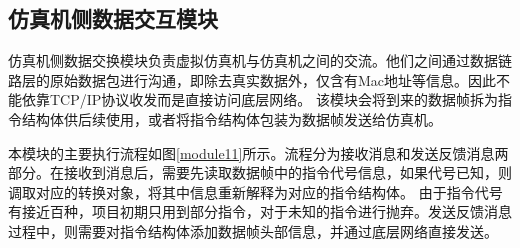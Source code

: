 \subsection{仿真机侧数据交互模块}
仿真机侧数据交换模块负责虚拟仿真机与仿真机之间的交流。他们之间通过数据链路层的原始数据包进行沟通，即除去真实数据外，仅含有Mac地址等信息。因此不能依靠TCP/IP协议收发而是直接访问底层网络。
该模块会将到来的数据帧拆为指令结构体供后续使用，或者将指令结构体包装为数据帧发送给仿真机。
\par
本模块的主要执行流程如图\ref{module11}所示。流程分为接收消息和发送反馈消息两部分。在接收到消息后，需要先读取数据帧中的指令代号信息，如果代号已知，则调取对应的转换对象，将其中信息重新解释为对应的指令结构体。
由于指令代号有接近百种，项目初期只用到部分指令，对于未知的指令进行抛弃。发送反馈消息过程中，则需要对指令结构体添加数据帧头部信息，并通过底层网络直接发送。

